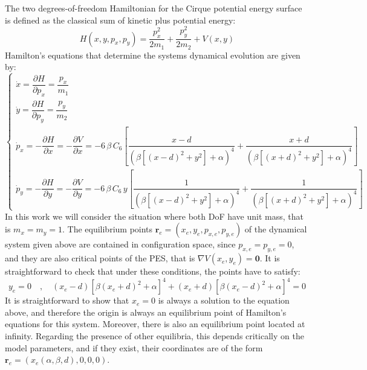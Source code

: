 \documentclass[10pt,aps,onecolumn,superscriptaddress]{revtex4-2}
\begin{document}
The two degrees-of-freedom Hamiltonian for the Cirque potential energy surface is defined as the classical sum of kinetic plus potential energy:
\begin{equation}
H(x,y,p_x,p_y) = \dfrac{p_x^2}{2 m_1} + \dfrac{p_y^2}{2 m_2} + V(x,y)
\label{eq:hamil}
\end{equation}
Hamilton's equations that determine the systems dynamical evolution are given by:
\begin{equation}
\begin{cases}
\dot{x} = \dfrac{\partial H}{\partial p_x} = \dfrac{p_x}{m_1} \\[.5cm]
\dot{y} = \dfrac{\partial H}{\partial p_y} = \dfrac{p_y}{m_2} \\
\dot{p}_x = - \dfrac{\partial H}{\partial x} = - \dfrac{\partial V}{\partial x} = - 6 \, \beta \, C_6 \left[\dfrac{x - d}{\left(\beta\left[\left(x - d\right)^2 + y^2\right] + \alpha\right)^4} + \dfrac{x + d}{\left(\beta\left[\left(x + d\right)^2 + y^2\right] + \alpha\right)^4}\right] \\[.7cm]
\dot{p}_y = - \dfrac{\partial H}{\partial y} = - \dfrac{\partial V}{\partial y} = - 6 \, \beta \, C_6 \, y \left[\dfrac{1}{\left(\beta\left[\left(x - d\right)^2 + y^2\right] + \alpha\right)^4} + \dfrac{1}{\left(\beta\left[\left(x + d\right)^2 + y^2\right] + \alpha\right)^4}\right]
\end{cases}
\label{eq:ham_eq}
\end{equation}
In this work we will consider the situation where both DoF have unit mass, that is $m_x = m_y = 1$. The equilibrium points $\mathbf{r}_e = (x_e,y_e,p_{x,e},p_{y,e})$ of the dynamical system given above are contained in configuration space, since $p_{x,e} = p_{y,e} = 0$, and they are also critical points of the PES, that is $\nabla V (x_e,y_e) = \mathbf{0}$. It is straightforward to check that under these conditions, the points have to satisfy:
\begin{equation}
y_e = 0 \quad , \quad \left(x_e - d\right) \left[\beta\left(x_e + d\right)^2 + \alpha\right]^4 + \left(x_e + d\right) \left[\beta\left(x_e - d\right)^2 + \alpha\right]^4 = 0 
\label{eq:eq_pts}
\end{equation}
It is straightforward to show that $x_e = 0$ is always a solution to the equation above, and therefore the origin is always an equilibrium point of Hamilton's equations for this system. Moreover, there is also an equilibrium point located at infinity. Regarding the presence of other equilibria, this depends critically on the model parameters, and if they exist, their coordinates are of the form $\mathbf{r}_e = (x_e(\alpha,\beta,d),0,0,0)$. 
\end{document}
